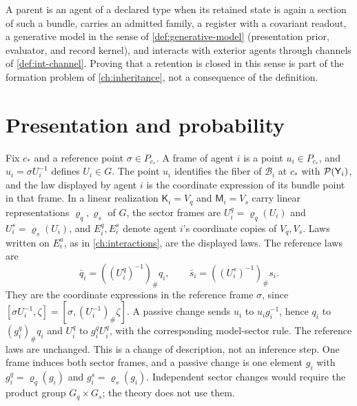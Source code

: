 A parent is an agent of a declared type when its retained state is again a section of such a bundle, carries an admitted family, a register with a covariant readout, a generative model in the sense of \cref{def:generative-model} (presentation prior, evaluator, and record kernel), and interacts with exterior agents through channels of \cref{def:int-channel}. Proving that a retention is closed in this sense is part of the formation problem of \cref{ch:inheritance}, not a consequence of the definition.

\section{Presentation and probability}

Fix $c_*$ and a reference point $\sigma\in P_{c_*}$. A frame of agent $i$ is a point $u_i\in P_{c_*}$, and $u_i=\sigma U_i^{-1}$ defines $U_i\in G$. The point $u_i$ identifies the fiber of $\mathcal B_i$ at $c_*$ with $\mathcal P(\mathsf Y_i)$, and the law displayed by agent $i$ is the coordinate expression of its bundle point in that frame. In a linear realization $\mathsf K_i=V_q$ and $\mathsf M_i=V_s$ carry linear representations $\varrho_q,\varrho_s$ of $G$, the sector frames are $U_i^q=\varrho_q(U_i)$ and $U_i^s=\varrho_s(U_i)$, and $E_i^q,E_i^s$ denote agent $i$'s coordinate copies of $V_q,V_s$. Laws written on $E_i^a$, as in \cref{ch:interactions}, are the displayed laws. The reference laws are
\begin{equation}
\bar q_i=((U_i^q)^{-1})_\#q_i,
\qquad
\bar s_i=((U_i^s)^{-1})_\#s_i.
\label{eq:reference-laws}
\end{equation}
They are the coordinate expressions in the reference frame $\sigma$, since $[\sigma U_i^{-1},\zeta]=[\sigma,(U_i^{-1})_\#\zeta]$. A passive change sends $u_i$ to $u_ig_i^{-1}$, hence $q_i$ to $(g_i^q)_\#q_i$ and $U_i^q$ to $g_i^qU_i^q$, with the corresponding model-sector rule. The reference laws are unchanged. This is a change of description, not an inference step. One frame induces both sector frames, and a passive change is one element $g_i$ with $g_i^q=\varrho_q(g_i)$ and $g_i^s=\varrho_s(g_i)$. Independent sector changes would require the product group $G_q\times G_s$; the theory does not use them.

